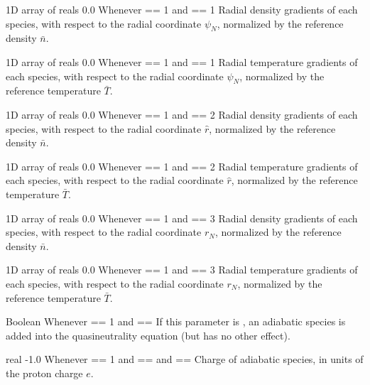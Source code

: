 \myhrule

{1D array of reals}
{0.0}
{Whenever  == 1 and  == 1}
{Radial density gradients of each species, with respect to the radial coordinate $\psi_N$, normalized by the reference density $\bar{n}$.}

\myhrule

{1D array of reals}
{0.0}
{Whenever  == 1 and  == 1}
{Radial temperature gradients of each species, with respect to the radial coordinate $\psi_N$, normalized by the reference temperature $\bar{T}$.}

\myhrule

{1D array of reals}
{0.0}
{Whenever  == 1 and  == 2}
{Radial density gradients of each species, with respect to the radial coordinate $\hat{r}$, normalized by the reference density $\bar{n}$.}

\myhrule

{1D array of reals}
{0.0}
{Whenever  == 1 and  == 2}
{Radial temperature gradients of each species, with respect to the radial coordinate $\hat{r}$, normalized by the reference temperature $\bar{T}$.}

\myhrule

{1D array of reals}
{0.0}
{Whenever  == 1 and  == 3}
{Radial density gradients of each species, with respect to the radial coordinate $r_N$, normalized by the reference density $\bar{n}$.}

\myhrule

{1D array of reals}
{0.0}
{Whenever  == 1 and  == 3}
{Radial temperature gradients of each species, with respect to the radial coordinate $r_N$, normalized by the reference temperature $\bar{T}$.}

\myhrule

{Boolean}
{\false}
{Whenever  == 1 and  == \true}
{If this parameter is \true, an adiabatic species is added into the quasineutrality equation (but has no other effect).}

\myhrule

{real}
{-1.0}
{Whenever  == 1 and  == \true and  == \true}
{Charge of adiabatic species, in units of the proton charge $e$.}

